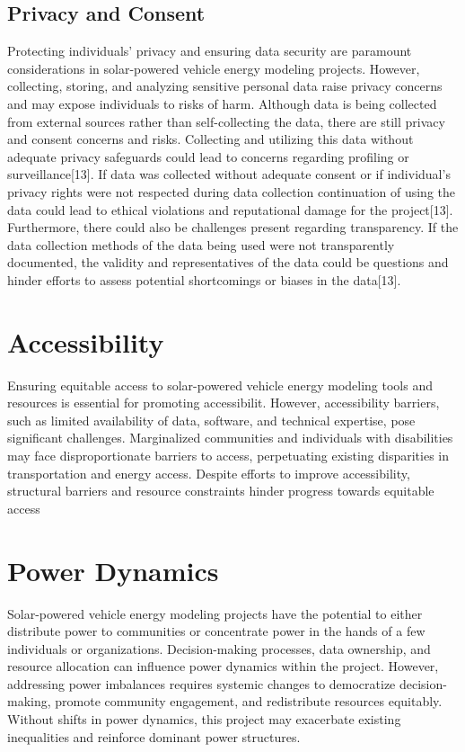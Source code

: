 \documentclass[10pt,twocolumn]{article}
\begin{document}
\subsection{Privacy and Consent}
Protecting individuals' privacy and ensuring data security are paramount considerations in solar-powered vehicle energy modeling projects. However, collecting, storing, and analyzing sensitive personal data raise privacy concerns and may expose individuals to risks of harm. Although data is being collected from external sources rather than self-collecting the data, there are still privacy and consent concerns and risks. Collecting and utilizing this data without adequate privacy safeguards could lead to concerns regarding profiling or surveillance[13]. If data was collected without adequate consent or if individual's privacy rights were not respected during data collection continuation of using the data could lead to ethical violations and reputational damage for the project[13]. Furthermore, there could also be challenges present regarding transparency. If the data collection methods of the data being used were not transparently documented, the validity and representatives of the data could be questions and hinder efforts to assess potential shortcomings or biases in the data[13]. 

\section{Accessibility}
Ensuring equitable access to solar-powered vehicle energy modeling tools and resources is essential for promoting accessibilit. However, accessibility barriers, such as limited availability of data, software, and technical expertise, pose significant challenges. Marginalized communities and individuals with disabilities may face disproportionate barriers to access, perpetuating existing disparities in transportation and energy access. Despite efforts to improve accessibility, structural barriers and resource constraints hinder progress towards equitable access
\section{Power Dynamics}
Solar-powered vehicle energy modeling projects have the potential to either distribute power to communities or concentrate power in the hands of a few individuals or organizations. Decision-making processes, data ownership, and resource allocation can influence power dynamics within the project. However, addressing power imbalances requires systemic changes to democratize decision-making, promote community engagement, and redistribute resources equitably. Without shifts in power dynamics, this project may exacerbate existing inequalities and reinforce dominant power structures.
\end{document}
